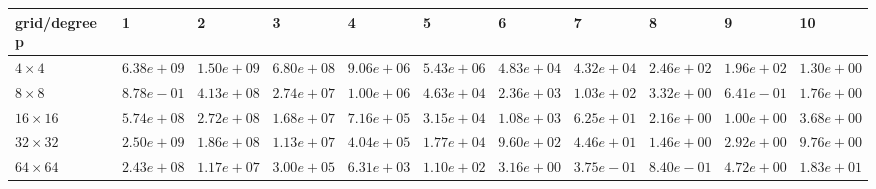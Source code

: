 \begin{tabular}{lllllllllll}
\hline
 grid/degree p   & 1          & 2          & 3          & 4          & 5          & 6          & 7          & 8          & 9          & 10         \\
\hline
 $4 \times 4$    & $6.38e+09$ & $1.50e+09$ & $6.80e+08$ & $9.06e+06$ & $5.43e+06$ & $4.83e+04$ & $4.32e+04$ & $2.46e+02$ & $1.96e+02$ & $1.30e+00$ \\
 $8 \times 8$    & $8.78e-01$ & $4.13e+08$ & $2.74e+07$ & $1.00e+06$ & $4.63e+04$ & $2.36e+03$ & $1.03e+02$ & $3.32e+00$ & $6.41e-01$ & $1.76e+00$ \\
 $16 \times 16$  & $5.74e+08$ & $2.72e+08$ & $1.68e+07$ & $7.16e+05$ & $3.15e+04$ & $1.08e+03$ & $6.25e+01$ & $2.16e+00$ & $1.00e+00$ & $3.68e+00$ \\
 $32 \times 32$  & $2.50e+09$ & $1.86e+08$ & $1.13e+07$ & $4.04e+05$ & $1.77e+04$ & $9.60e+02$ & $4.46e+01$ & $1.46e+00$ & $2.92e+00$ & $9.76e+00$ \\
 $64 \times 64$  & $2.43e+08$ & $1.17e+07$ & $3.00e+05$ & $6.31e+03$ & $1.10e+02$ & $3.16e+00$ & $3.75e-01$ & $8.40e-01$ & $4.72e+00$ & $1.83e+01$ \\
\hline
\end{tabular}